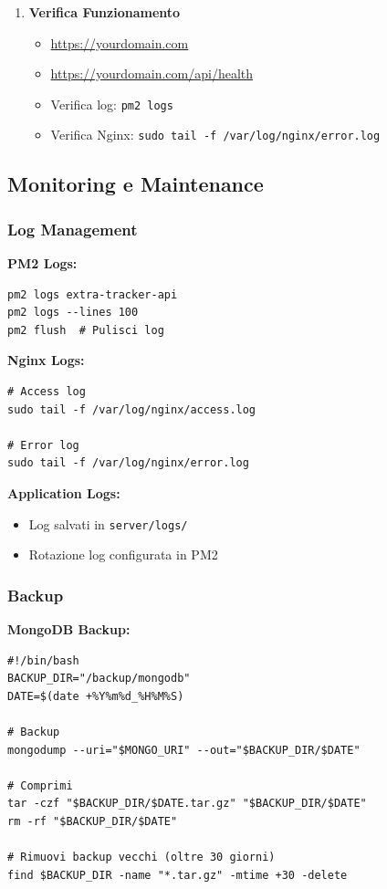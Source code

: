 \documentclass[11pt,a4paper]{article}
\newcommand{\code}[1]{\texttt{#1}}
\begin{document}
\begin{enumerate}
    \item \textbf{Verifica Funzionamento}
    \begin{itemize}
        \item \url{https://yourdomain.com}
        \item \url{https://yourdomain.com/api/health}
        \item Verifica log: \code{pm2 logs}
        \item Verifica Nginx: \code{sudo tail -f /var/log/nginx/error.log}
    \end{itemize}
\end{enumerate}

\subsection{Monitoring e Maintenance}

\subsubsection{Log Management}

\textbf{PM2 Logs:}
\begin{lstlisting}
pm2 logs extra-tracker-api
pm2 logs --lines 100
pm2 flush  # Pulisci log
\end{lstlisting}

\textbf{Nginx Logs:}
\begin{lstlisting}
# Access log
sudo tail -f /var/log/nginx/access.log

# Error log
sudo tail -f /var/log/nginx/error.log
\end{lstlisting}

\textbf{Application Logs:}
\begin{itemize}
    \item Log salvati in \code{server/logs/}
    \item Rotazione log configurata in PM2
\end{itemize}

\subsubsection{Backup}

\textbf{MongoDB Backup:}
\begin{lstlisting}[caption=Script Backup MongoDB]
#!/bin/bash
BACKUP_DIR="/backup/mongodb"
DATE=$(date +%Y%m%d_%H%M%S)

# Backup
mongodump --uri="$MONGO_URI" --out="$BACKUP_DIR/$DATE"

# Comprimi
tar -czf "$BACKUP_DIR/$DATE.tar.gz" "$BACKUP_DIR/$DATE"
rm -rf "$BACKUP_DIR/$DATE"

# Rimuovi backup vecchi (oltre 30 giorni)
find $BACKUP_DIR -name "*.tar.gz" -mtime +30 -delete
\end{lstlisting}
\end{document}
